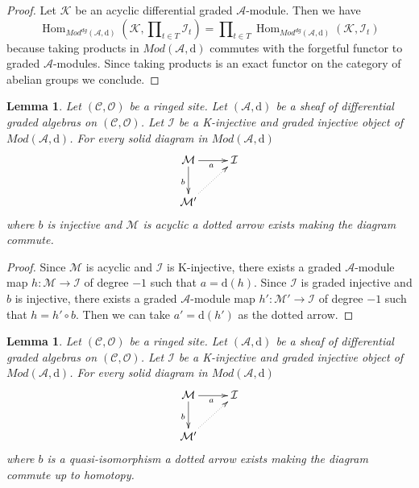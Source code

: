 \documentclass{stacks-project}
\theoremstyle{plain}
\newtheorem{lemma}[subsection]{Lemma}
\theoremstyle{definition}
\theoremstyle{remark}
\numberwithin{equation}{subsection}
\def\Hom{\mathop{\mathrm{Hom}}\nolimits}
\begin{document}
\begin{proof}
Let $\mathcal{K}$ be an acyclic differential graded $\mathcal{A}$-module.
Then we have
$$
\Hom_{\textit{Mod}^{dg}(\mathcal{A}, \text{d})}(\mathcal{K},
\prod\nolimits_{t \in T} \mathcal{I}_t)
=
\prod\nolimits_{t \in T}
\Hom_{\textit{Mod}^{dg}(\mathcal{A}, \text{d})}(\mathcal{K}, \mathcal{I}_t)
$$
because taking products in $\textit{Mod}(\mathcal{A}, \text{d})$
commutes with the forgetful functor to graded $\mathcal{A}$-modules.
Since taking products is an exact functor on the category of abelian groups
we conclude.
\end{proof}

\begin{lemma}
\label{lemma-first-property-dg-injective}
Let $(\mathcal{C}, \mathcal{O})$ be a ringed site.
Let $(\mathcal{A}, \text{d})$
be a sheaf of differential graded algebras on $(\mathcal{C}, \mathcal{O})$.
Let $\mathcal{I}$ be a K-injective and graded injective
object of $\textit{Mod}(\mathcal{A}, \text{d})$.
For every solid diagram in $\textit{Mod}(\mathcal{A}, \text{d})$
$$
\xymatrix{
\mathcal{M} \ar[r]_a \ar[d]_b & \mathcal{I} \\
\mathcal{M}' \ar@{..>}[ru]
}
$$
where $b$ is injective and $\mathcal{M}$ is acyclic
a dotted arrow exists making the diagram commute.
\end{lemma}

\begin{proof}
Since $\mathcal{M}$ is acyclic and $\mathcal{I}$ is K-injective,
there exists a graded $\mathcal{A}$-module map
$h : \mathcal{M} \to \mathcal{I}$ of degree $-1$
such that $a = \text{d}(h)$. Since $\mathcal{I}$ is graded injective
and $b$ is injective, there exists a graded $\mathcal{A}$-module
map $h' : \mathcal{M}' \to \mathcal{I}$ of degree $-1$
such that $h = h' \circ b$. Then we can take $a' = \text{d}(h')$
as the dotted arrow.
\end{proof}

\begin{lemma}
\label{lemma-second-property-dg-injective}
Let $(\mathcal{C}, \mathcal{O})$ be a ringed site. Let
$(\mathcal{A}, \text{d})$ be a sheaf of differential graded algebras on
$(\mathcal{C}, \mathcal{O})$. Let $\mathcal{I}$ be a
K-injective and graded injective
object of $\textit{Mod}(\mathcal{A}, \text{d})$.
For every solid diagram in $\textit{Mod}(\mathcal{A}, \text{d})$
$$
\xymatrix{
\mathcal{M} \ar[r]_a \ar[d]_b & \mathcal{I} \\
\mathcal{M}' \ar@{..>}[ru]
}
$$
where $b$ is a quasi-isomorphism a dotted arrow exists making the
diagram commute up to homotopy.
\end{lemma}
\end{document}

